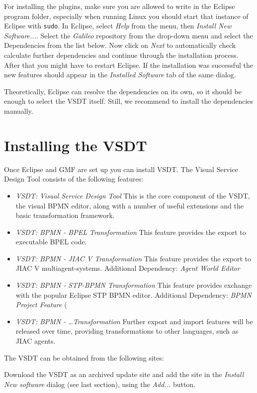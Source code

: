 For installing the plugins, make sure you are allowed to write in the Eclipse
program folder, especially when running Linux you should start that instance of
Eclipse with \texttt{sudo}.  In Eclipse, select \emph{Help} from the menu, then
\emph{Install New Software...}.  Select the \emph{Galileo} repository from the
drop-down menu and select the Dependencies from the list below.  Now click on
\emph{Next} to automatically check calculate further dependencies and continue
through the installation process.  After that you might have to restart Eclipse.
If the installation was successful the new features should appear in the
\emph{Installed Software} tab of the same dialog.

Theoretically, Eclipse can resolve the dependencies on its own, so it should be
enough to select the VSDT itself.  Still, we recommend to install the dependencies
manually.


\section{Installing the VSDT}
\label{sec:user_setup_vsdt}

Once Eclipse and GMF are set up you can install VSDT.  The Visual Service Design
Tool consists of the following features:

\begin{itemize}
	\item \emph{VSDT: Visual Service Design Tool} This is the core component of
	the VSDT, the visual BPMN editor, along with a number of useful extensions
	and the basic transformation framework.



	\item \emph{VSDT: BPMN - BPEL Transformation} This feature provides the export
	to executable BPEL code.

	\item \emph{VSDT: BPMN - JIAC V Transformation} This feature provides the
	export to JIAC V multiagent-systems.  Additional Dependency: \emph{Agent World
	Editor}

	\item \emph{VSDT: BPMN - STP-BPMN Transformation} This feature provides
	exchange with the popular Eclipse STP BPMN editor.  Additional Dependency:
	\emph{BPMN Project Feature} (

	\item \emph{VSDT: BPMN - \dots Transformation} Further export and import
	features will be released over time, providing transformations to other
	languages, such as JIAC agents.
\end{itemize}

The VSDT can be obtained from the following sites:
\begin{center}
	\downloadsites
\end{center}

Download the VSDT as an archived update site and add the site in the \emph{Install
New software} dialog (see last section), using the \emph{Add...} button.

